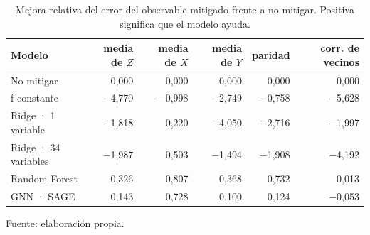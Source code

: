 \begin{table}[htbp]
    \centering
    {\footnotesize
    \begin{tabular}{@{}lrrrrr@{}}
        \toprule
        \textbf{Modelo} & \textbf{media de $Z$} & \textbf{media de $X$} & \textbf{media de $Y$} & \textbf{paridad} & \textbf{corr. de vecinos} \\
        \midrule
        No mitigar & 0,000 & 0,000 & 0,000 & 0,000 & 0,000 \\
        f constante & $-$4,770 & $-$0,998 & $-$2,749 & $-$0,758 & $-$5,628 \\
        Ridge · 1 variable & $-$1,818 & 0,220 & $-$4,050 & $-$2,716 & $-$1,997 \\
        Ridge · 34 variables & $-$1,987 & 0,503 & $-$1,494 & $-$1,908 & $-$4,192 \\
        Random Forest & 0,326 & 0,807 & 0,368 & 0,732 & 0,013 \\
        GNN · SAGE & 0,143 & 0,728 & 0,100 & 0,124 & $-$0,053 \\
        \bottomrule
    \end{tabular}}

    \caption{Mejora relativa del error del observable mitigado frente a no mitigar. Positiva significa que el modelo ayuda.}
    \label{tab:comparativa_mejora}

    {\footnotesize Fuente: elaboración propia.}
\end{table}
